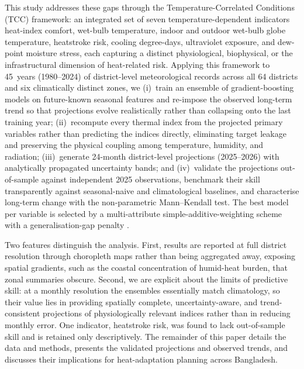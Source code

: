 \documentclass[pdflatex,sn-basic,lineno]{sn-jnl}
\begin{document}
This study addresses these gaps through the Temperature-Correlated Conditions
(TCC) framework: an integrated set of seven temperature-dependent indicators
 heat-index comfort, wet-bulb temperature, indoor and outdoor wet-bulb globe
temperature, heatstroke risk, cooling degree-days, ultraviolet exposure, and
dew-point moisture stress, each capturing a distinct physiological, biophysical,
or the infrastructural dimension of heat-related risk. Applying this framework to
45~years (1980--2024) of district-level meteorological records across all
64 districts and six climatically distinct zones, we (i)~train an ensemble of
gradient-boosting models \citep{Breiman2001} on future-known seasonal features and
re-impose the observed long-term trend so that projections evolve realistically
rather than collapsing onto the last training year; (ii)~recompute every thermal
index from the projected primary variables rather than predicting the indices
directly, eliminating target leakage and preserving the physical coupling among
temperature, humidity, and radiation; (iii)~generate 24-month district-level
projections (2025--2026) with analytically propagated uncertainty bands; and
(iv)~validate the projections out-of-sample against independent 2025 observations,
benchmark their skill transparently against seasonal-naive and climatological
baselines, and characterise long-term change with the non-parametric
Mann--Kendall test. The best model per variable is selected by a multi-attribute
simple-additive-weighting scheme with a generalisation-gap penalty
\citep{Hwang1981}.

Two features distinguish the analysis. First, results are reported at full
district resolution through choropleth maps rather than being aggregated away, exposing
spatial gradients, such as the coastal concentration of humid-heat burden, that zonal summaries obscure. Second, we are explicit about the limits of predictive
skill: at a monthly resolution the ensembles essentially match climatology, so their
value lies in providing spatially complete, uncertainty-aware, and
trend-consistent projections of physiologically relevant indices rather than in
reducing monthly error. One indicator, heatstroke risk, was found to lack
out-of-sample skill and is retained only descriptively. The remainder of this
paper details the data and methods, presents the validated projections and
observed trends, and discusses their implications for heat-adaptation planning
across Bangladesh.

\end{document}
